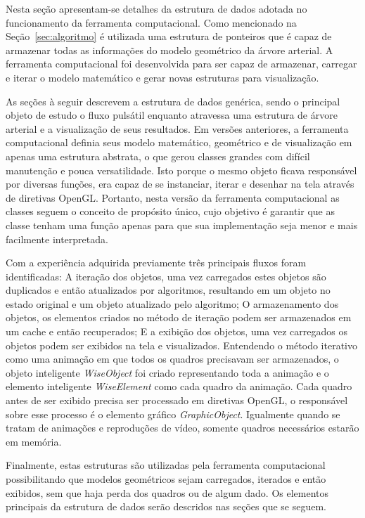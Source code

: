 \documentclass[a4paper,12pt]{monografia}
\theoremstyle{plain}
\theoremstyle{definition}
\theoremstyle{remark}
\begin{document}
Nesta seção apresentam-se detalhes da estrutura de dados adotada no funcionamento da ferramenta computacional. Como mencionado na Seção~\ref{sec:algoritmo} é utilizada uma estrutura de ponteiros que é capaz de armazenar todas as informações do modelo geométrico da árvore arterial. A ferramenta computacional foi desenvolvida para ser capaz de armazenar, carregar e iterar o modelo matemático e gerar novas estruturas para visualização.

As seções à seguir descrevem a estrutura de dados genérica, sendo o principal objeto de estudo o fluxo pulsátil enquanto atravessa uma estrutura de árvore arterial e a visualização de seus resultados. Em versões anteriores, a ferramenta computacional  definia seus modelo matemático, geométrico e de visualização em apenas uma estrutura abstrata, o que gerou classes grandes com difícil manutenção e pouca versatilidade. Isto porque o mesmo objeto ficava responsável por diversas funções, era capaz de se instanciar, iterar e desenhar na tela através de diretivas OpenGL. Portanto, nesta versão da ferramenta computacional as classes seguem o conceito de propósito único, cujo objetivo é garantir que as classe tenham uma função apenas para que sua implementação seja menor e mais facilmente interpretada.

Com a experiência adquirida previamente três principais fluxos foram identificadas:  A iteração dos objetos, uma vez carregados estes objetos são duplicados e então atualizados por algoritmos, resultando em um objeto no estado original e um objeto atualizado pelo algoritmo; O armazenamento dos objetos, os elementos criados no método de iteração podem ser armazenados em um cache e então recuperados;  E a exibição dos objetos, uma vez carregados os objetos podem ser exibidos na tela e visualizados. Entendendo o método iterativo como uma animação em que todos os quadros precisavam ser armazenados, o objeto inteligente \textit{WiseObject} foi criado representando toda a animação e o elemento inteligente \textit{WiseElement} como cada quadro da animação. Cada quadro antes de ser exibido precisa ser processado em diretivas OpenGL, o responsável sobre esse processo é o elemento gráfico \textit{GraphicObject}. Igualmente quando se tratam de animações e reproduções de vídeo, somente quadros necessários estarão em memória. 

Finalmente, estas estruturas são utilizadas pela ferramenta computacional possibilitando que modelos geométricos sejam carregados, iterados e então exibidos, sem que haja perda dos quadros ou de algum dado. Os elementos principais da estrutura de dados serão descridos nas seções que se seguem.
\end{document}
